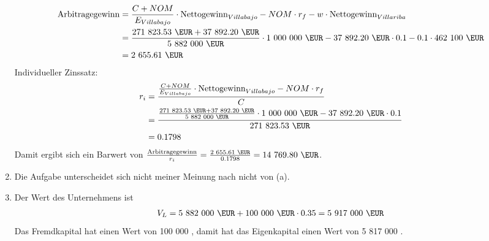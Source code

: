 \documentclass{article}
\begin{document}
\begin{enumerate}[label=(\alph*)]
		\begin{align}
			\text{Arbitragegewinn} &= \frac{C+NOM}{E_{Villabajo}}\cdot\text{Nettogewinn}_{Villabajo} - NOM\cdot r_f - w\cdot \text{Nettogewinn}_{Villariba} \notag \\
			&= \frac{\text{271 823.53 \EUR} +\text{37 892.20 \EUR} }{\text{5 882 000 \EUR}}\cdot \text{1 000 000 \EUR} - \text{37 892.20 \EUR}\cdot 0.1 - 0.1\cdot \text{462 100 \EUR} \notag \\
			&= \text{2 655.61 \EUR} \notag
		\end{align}
		Individueller Zinssatz:
		\begin{align}
			r_i &= \frac{\frac{C+NOM}{E_{Villabajo}}\cdot\text{Nettogewinn}_{Villabajo} - NOM\cdot r_f }{C} \notag \\
			&= \frac{\frac{\text{271 823.53 \EUR} +\text{37 892.20 \EUR} }{\text{5 882 000 \EUR}}\cdot \text{1 000 000 \EUR} - \text{37 892.20 \EUR}\cdot 0.1}{\text{271 823.53 \EUR}} \notag \\
			&= 0.1798 \notag
		\end{align}
		Damit ergibt sich ein Barwert von $\frac{\text{Arbitragegewinn}}{r_i} = \frac{\text{2 655.61 \EUR}}{0.1798}=\text{14 769.80 \EUR}$.
		\item Die Aufgabe unterscheidet sich nicht meiner Meinung nach nicht von (a).
		\item Der Wert des Unternehmens ist
		\begin{align}
			V_L = \text{5 882 000 \EUR} + \text{100 000 \EUR}\cdot 0.35 = \text{5 917 000 \EUR} \notag
		\end{align}
		Das Fremdkapital hat einen Wert von 100 000 \EUR, damit hat das Eigenkapital einen Wert von 5 817 000 \EUR.

\end{enumerate}
\end{document}
